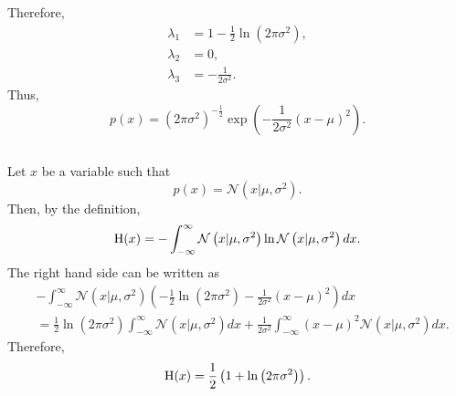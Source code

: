 %
Therefore,
%
\begin{equation}
\begin{aligned}
\lambda_1 
&=
1 
- 
\frac{1}{2} 
\ln 
\left( 
	2 \pi \sigma ^ 2 
\right), \\
\lambda_2 
&= 
0, \\
\lambda_3 
&= 
- \frac{1}{2 \sigma ^ 2}.
\end{aligned}
\end{equation}
%
Thus,
%
\begin{equation}
p(x) 
= 
\left( 
	2 \pi \sigma ^ 2 
\right) ^ {- \frac{1}{2}} 
\exp 
\left( 
	- 
	\frac{1}{2 \sigma ^ 2} 
	(x - \mu) ^ 2 
\right).
\end{equation}
%


\subsection{}
\label{1.35}
Let $x$ be a variable such that
%
\begin{equation}
p(x) 
= 
\mathcal{N} 
\left(
	x 
	| 
	\mu, 
	\sigma ^ 2
\right).
\end{equation}
%
Then, by the definition,
%
\begin{equation}
{\rm H}(x) 
= 
- 
\int_{- \infty}^{\infty} 
\mathcal{N} 
\left( 
	x 
	| 
	\mu, 
	\sigma ^ 2 
\right) 
\ln \mathcal{N} 
\left( 
	x 
	| 
	\mu, 
	\sigma ^ 2 
\right) 
dx.
\end{equation}
%
The right hand side can be written as
%
\begin{equation}
\begin{aligned}
&
- 
\int_{- \infty}^{\infty} 
\mathcal{N} 
\left( 
	x 
	| 
	\mu, 
	\sigma ^ 2 
\right) 
\left( 
	- 
	\frac{1}{2} 
	\ln 
	\left( 
		2 \pi \sigma ^ 2 
	\right) 
	- 
	\frac{1}{2 \sigma ^2} 
	(x - \mu) ^ 2 
\right) 
dx \\
&= 
\frac{1}{2} 
\ln 
\left( 
	2 \pi \sigma ^ 2 
\right) 
\int_{- \infty}^{\infty} 
\mathcal{N} 
\left( 
	x 
	| 
	\mu, 
	\sigma ^ 2 
\right) 
dx 
+ 
\frac{1}{2 \sigma ^2} 
\int_{- \infty}^{\infty} 
(x - \mu) ^ 2 
\mathcal{N} 
\left( 
	x 
	| 
	\mu, 
	\sigma ^ 2 
\right) 
dx.
\end{aligned}
\end{equation}
%
Therefore,
%
\begin{equation}
{\rm H}(x) 
= 
\frac{1}{2} 
\left( 
	1 
	+ 
	\ln 
	\left( 
		2 \pi \sigma ^ 2 
	\right) 
\right).
\end{equation}
%


